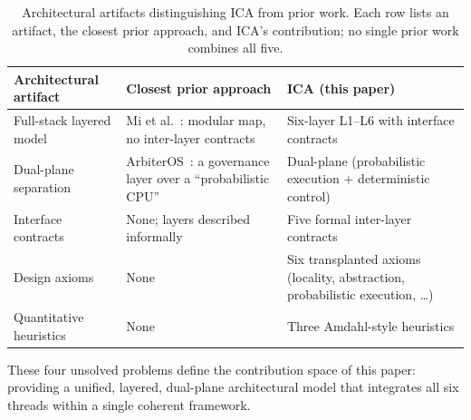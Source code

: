 \begin{table}[h]
\centering
\footnotesize
\caption{Architectural artifacts distinguishing ICA from prior work. Each row lists an artifact, the closest prior approach, and ICA's contribution; no single prior work combines all five.}
\label{tab:artifact-comparison}
\begin{tabularx}{\textwidth}{>{\raggedright\arraybackslash}p{}>{\raggedright\arraybackslash}p{}>{\raggedright\arraybackslash}p{}}
\toprule
\textbf{Architectural artifact} & \textbf{Closest prior approach} & \textbf{ICA (this paper)} \\
\midrule
Full-stack layered model & Mi et al.~\cite{mi2025llmagentscomputersystems}: modular map, no inter-layer contracts & Six-layer L1--L6 with interface contracts \\
Dual-plane separation & ArbiterOS~\cite{arbiteros2025}: a governance layer over a ``probabilistic CPU'' & Dual-plane (probabilistic execution + deterministic control) \\
Interface contracts & None; layers described informally & Five formal inter-layer contracts \\
Design axioms & None & Six transplanted axioms (locality, abstraction, probabilistic execution, \ldots) \\
Quantitative heuristics & None & Three Amdahl-style heuristics \\
\bottomrule
\end{tabularx}
\end{table}

These four unsolved problems define the contribution space of this paper: providing a unified, layered, dual-plane architectural model that integrates all six threads within a single coherent framework.
